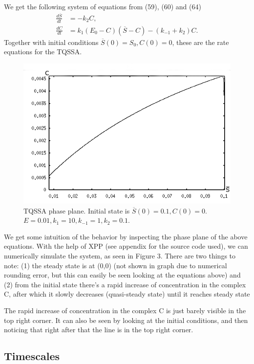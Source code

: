 \documentclass[12pt]{article}
\begin{document}
We get the following system of equations from (59), (60) and (64)
\begin{align}
\frac{d\overline{S}}{dt} &= - k_2 C, \\
\frac{dC}{dt} &= k_1(E_0-C)(\overline{S}-C)-(k_{-1}+ k_2) C.
\end{align}
Together with initial conditions $\overline{S}(0)=S_0, C(0)=0$, these
are the rate equations for the TQSSA.
\begin{figure}[ht!]
\centering
\includegraphics[width=120mm]
{tqssa-phase-plane-b_axis.png}
\caption{TQSSA phase plane. Initial state is $\overline{S}(0)=0.1,
  C(0)=0$. $E=0.01, k_1=10, k_{-1}=1, k_2=0.1$.}
\label{overflow}
\end{figure}

We get some intuition of the behavior by inspecting the phase plane of
the above equations. With the help of XPP (see appendix for the source
code used), we can numerically simulate the system, as seen in Figure
3. There are two things to note: (1) the steady state is at (0,0) (not
shown in graph due to numerical rounding error, but this can easily be
seen looking at the equations above) and (2) from the initial state
there's a rapid increase of concentration in the complex C, after
which it slowly decreases (quasi-steady state) until it reaches steady
state

The rapid increase of concentration in the complex C is just barely
visible in the top right corner. It can also be seen by looking at the
initial conditions, and then noticing that right after that the line
is in the top right corner.

\subsection{Timescales}
\end{document}
